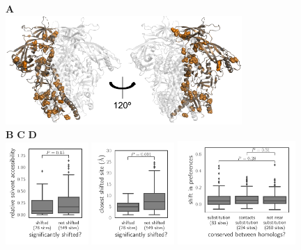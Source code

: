 \documentclass[9pt]{elife}
\begin{document}
\begin{figure}
{\bf \Large A} \\
\includegraphics[width=0.8\textwidth]{figures/shifts_on_structure/shifts_on_structure.pdf}
\\
{\bf \Large B} \hspace{0.28\textwidth} {\bf \Large C} \hspace{0.28\textwidth} {\bf \Large D} \\
\includegraphics[width=0.28\textwidth]{figures/rsa_vs_shifts.pdf}
\hspace{0.01\textwidth}
\includegraphics[width=0.28\textwidth]{figures/shifts_proximity.pdf}
\hspace{0.01\textwidth}
\includegraphics[width=0.4\textwidth]{figures/conservation_vs_shifts.pdf} 

\end{figure}
\end{document}
